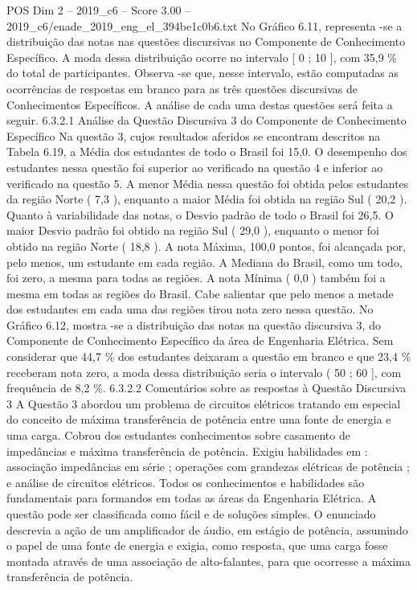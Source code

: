 \begin{textsample}{POS Dim 2 – 2019\_c6 – Score 3.00 – 2019\_c6/enade\_2019\_eng\_el\_394be1c0b6.txt}
No Gráfico 6.11, representa -se a distribuição das notas nas questões discursivas no Componente de Conhecimento Específico.
A moda dessa distribuição ocorre no intervalo [ 0 ; 10 ], com 35,9 \% do total de participantes.
Observa -se que, nesse intervalo, estão computadas as ocorrências de respostas em branco para as três questões discursivas de Conhecimentos Específicos.
A análise de cada uma destas questões será feita a seguir. 6.3.2.1 Análise da Questão Discursiva 3 do Componente de Conhecimento Específico Na questão 3, cujos resultados aferidos se encontram descritos na Tabela 6.19, a Média dos estudantes de todo o Brasil foi 15,0.
O desempenho dos estudantes nessa questão foi superior ao verificado na questão 4 e inferior ao verificado na questão 5.
A menor Média nessa questão foi obtida pelos estudantes da região Norte ( 7,3 ), enquanto a maior Média foi obtida na região Sul ( 20,2 ).
Quanto à variabilidade das notas, o Desvio padrão de todo o Brasil foi 26,5.
O maior Desvio padrão foi obtido na região Sul ( 29,0 ), enquanto o menor foi obtido na região Norte ( 18,8 ).
A nota Máxima, 100,0 pontos, foi alcançada por, pelo menos, um estudante em cada região.
A Mediana do Brasil, como um todo, foi zero, a mesma para todas as regiões.
A nota Mínima ( 0,0 ) também foi a mesma em todas as regiões do Brasil.
Cabe salientar que pelo menos a metade dos estudantes em cada uma das regiões tirou nota zero nessa questão.
No Gráfico 6.12, mostra -se a distribuição das notas na questão discursiva 3, do Componente de Conhecimento Específico da área de Engenharia Elétrica.
Sem considerar que 44,7 \% dos estudantes deixaram a questão em branco e que 23,4 \% receberam nota zero, a moda dessa distribuição seria o intervalo ( 50 ; 60 ], com frequência de 8,2 \%. 6.3.2.2 Comentários sobre as respostas à Questão Discursiva 3 A Questão 3 abordou um problema de circuitos elétricos tratando em especial do conceito de máxima transferência de potência entre uma fonte de energia e uma carga.
Cobrou dos estudantes conhecimentos sobre casamento de impedâncias e máxima transferência de potência.
Exigiu habilidades em : associação impedâncias em série ; operações com grandezas elétricas de potência ; e análise de circuitos elétricos.
Todos os conhecimentos e habilidades são fundamentais para formandos em todas as áreas da Engenharia Elétrica.
A questão pode ser classificada como fácil e de soluções simples.
O enunciado descrevia a ação de um amplificador de áudio, em estágio de potência, assumindo o papel de uma fonte de energia e exigia, como resposta, que uma carga fosse montada através de uma associação de alto-falantes, para que ocorresse a máxima transferência de potência.

\end{textsample}

